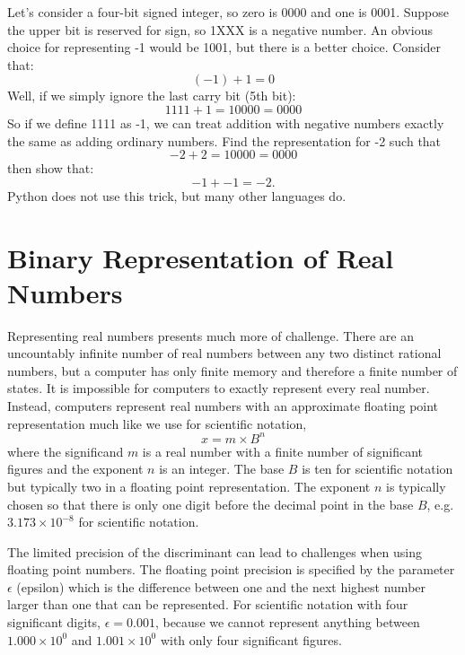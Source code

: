 \plot Let's consider a four-bit signed integer, so zero is 0000 and one is 0001.
Suppose the upper bit is reserved for sign, so 1XXX is a negative
number.  An obvious choice for representing -1 would be 1001, but there is a better
choice.  Consider that:
\begin{displaymath}
(-1) + 1 = 0  
\end{displaymath}
Well, if we simply ignore the last carry bit (5th bit):
\begin{displaymath}
1111 + 1 = 10000 = 0000  
\end{displaymath}
So if we define 1111 as -1, we can treat addition with negative numbers exactly the same as adding ordinary numbers.  Find the representation for -2 such that
\begin{displaymath}
-2 + 2 = 10000 = 0000
\end{displaymath}
then show that:
\begin{displaymath}
-1 + -1 = -2. 
\end{displaymath}
Python does not use this trick, but many other languages do.\\

\section{Binary Representation of Real Numbers}

Representing real numbers presents much more of challenge.  There are
an uncountably infinite number of real numbers between any two
distinct rational numbers, but a computer has only finite memory and
therefore a finite number of states.  It is impossible for computers
to exactly represent every real number.  Instead, computers represent
real numbers with an approximate floating point representation much
like we use for scientific notation,
\begin{displaymath}
x = m \times B^n
\end{displaymath}
where the significand $m$ is a real number with a finite number of
significant figures and the exponent $n$ is an integer.  The base $B$
is ten for scientific notation but typically two in a floating point
representation.  The exponent $n$ is typically chosen so that there is
only one digit before the decimal point in the base $B$, e.g. $3.173
\times 10^{-8}$ for scientific notation.

The limited precision of the discriminant can lead to challenges when
using floating point numbers.  The floating point precision is
specified by the parameter $\epsilon$ (epsilon) which is the
difference between one and the next highest number larger than one
that can be represented.  For scientific notation with four
significant digits, $\epsilon=0.001$, because we cannot represent
anything between $1.000 \times 10^0$ and $1.001 \times 10^0$ with only
four significant figures. \\

